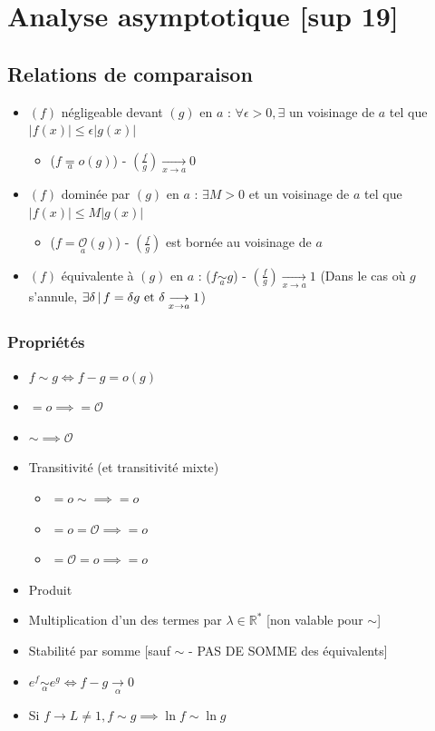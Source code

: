 \documentclass[openany]{book}
\begin{document}
\clearpage
\section{Analyse asymptotique [sup 19]}
\subsection{Relations de comparaison}
\begin{itemize}
    \item $(f)$ négligeable devant $(g)$ en $a$ : $\forall \epsilon > 0, \exists$ un voisinage de $a$ tel que $|f(x)| \leq \epsilon |g(x)|$
    \begin{itemize}
        \item ($ f \underset{a}= o(g) $) - $ (\frac{f}{g}) \underset{x \rightarrow a}{\longrightarrow}  0 $
    \end{itemize}
    \item $(f)$ dominée par $(g)$ en $a$ : $\exists M > 0$ et un voisinage de $a$ tel que $|f(x)| \leq M |g(x)|$
    \begin{itemize}
        \item ($ f = \underset{a}{\mathcal{O}} (g) $) - $ (\frac{f}{g}) $ est bornée au voisinage de $a$
    \end{itemize}
    \item $(f)$ équivalente à $(g)$ en $a$ : ($ f \underset{a}\sim g $) - $ (\frac{f}{g}) \underset{x \rightarrow a}{\longrightarrow}  1 $ (Dans le cas où $g$ s'annule, $\exists \delta \, | \, f = \delta g \text{ et } \delta \underset{x \rightarrow a}{\longrightarrow} 1$)
\end{itemize}

\subsubsection{Propriétés}
\begin{itemize}
    \item $ f \sim g \iff f - g =o(g) $
    \item $ =o \implies = \mathcal{O} $
    \item $ \sim \implies \mathcal{O} $
    \item Transitivité (et transitivité mixte) 
    \begin{itemize}
        \item $ =o \sim \implies =o$
        \item $ =o =\mathcal{O} \implies =o$
        \item $ =\mathcal{O} =o \implies =o $
    \end{itemize}
    \item Produit
    \item Multiplication d'un des termes par $\lambda \in \mathbb{R}^*$ [non valable pour $\sim$]
    \item Stabilité par somme [sauf $\sim$ - PAS DE SOMME des équivalents]
    \item $e^f \underset{\alpha}{\sim} e^g \iff f-g \underset{\alpha}{\longrightarrow} 0$
    \item Si $f \longrightarrow L \neq 1, f \sim g \implies \ln f \sim \ln g$
\end{itemize}
\end{document}
